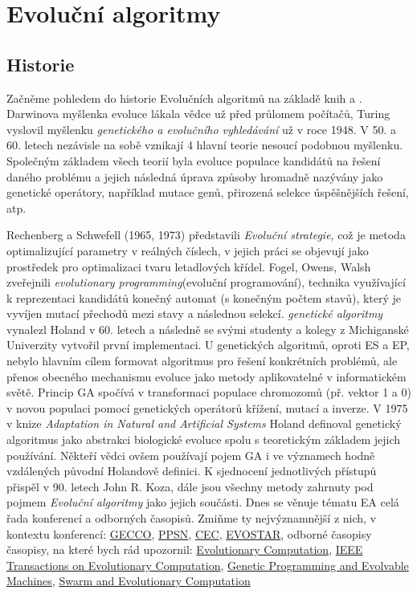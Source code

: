 \chapter{Evoluční algoritmy}
\section{Historie}
Začněme pohledem do historie Evolučních algoritmů na základě knih \cite{MitchellBook} a \cite{eibenIntro}. Darwinova myšlenka evoluce lákala vědce už před průlomem počítačů, Turing vyslovil myšlenku \textit{genetického a evolučního vyhledávání} už v roce 1948. V 50. a 60. letech nezávisle na sobě vznikají 4 hlavní teorie nesoucí podobnou myšlenku. Společným základem všech teorií byla evoluce populace kandidátů na řešení daného problému a jejich následná úprava způsoby hromadně nazývány jako genetické operátory, například mutace genů, přirozená selekce úspěšnějších řešení, atp.
\par 
Rechenberg a Schwefell (1965, 1973) představili \textit{Evoluční strategie}, což je metoda optimalizující parametry v reálných číslech, v jejich práci se objevují jako prostředek pro optimalizaci tvaru letadlových křídel. Fogel, Owens, Walsh zveřejnili \textit{evolutionary programming}(evoluční programování), technika využívající k reprezentaci kandidátů konečný automat (s konečným počtem stavů), který je vyvíjen mutací přechodů mezi stavy a následnou selekcí. \textit{genetické algoritmy} vynalezl Holand v 60. letech a následně se svými studenty a kolegy z Michiganské Univerzity vytvořil první implementaci. U genetických algoritmů, oproti ES a EP, nebylo hlavním cílem formovat algoritmus pro řešení konkrétních problémů, ale přenos obecného mechanismu evoluce jako metody aplikovatelné v informatickém světě. Princip GA spočívá v transformaci populace chromozomů (př. vektor 1 a 0) v novou populaci pomocí genetických operátorů křížení, mutací a inverze. V 1975 v knize \textit{Adaptation in Natural and  Artificial Systems} \cite{HolandBook} Holand definoval genetický algoritmus jako abstrakci biologické evoluce spolu s teoretickým základem jejich používání. Někteří vědci ovšem používají pojem GA i ve významech hodně vzdálených původní Holandově definici. K sjednocení jednotlivých přístupů přispěl v 90. letech John R. Koza, dále jsou všechny metody zahrnuty pod pojmem \textit{Evoluční algoritmy} jako jejich součásti. Dnes se věnuje tématu EA celá řada konferencí a odborných časopisů. Zmiňme ty nejvýznamnější z nich, v kontextu konferencí: 
\href{http://gecco-2017.sigevo.org/index.html/HomePage}{GECCO}, \href{http://www.ppsn2016.org/conference}{PPSN}, 
\href{http://www.cec2017.org/}{CEC}, 
\href{http://www.evostar.org/2018/}{EVOSTAR}, 
odborné časopisy časopisy, na které bych rád upozornil: 
\href{http://www.mitpressjournals.org/loi/evco}{Evolutionary Computation}, 
\href{http://ieeexplore.ieee.org/xpl/RecentIssue.jsp?reload=true&punumber=4235}{IEEE Transactions on Evolutionary Computation}, 
\href{http://www.springer.com/computer/ai/journal/10710}{Genetic Programming and Evolvable Machines},
\href{https://www.journals.elsevier.com/swarm-and-evolutionary-computation/}{Swarm and Evolutionary Computation}

